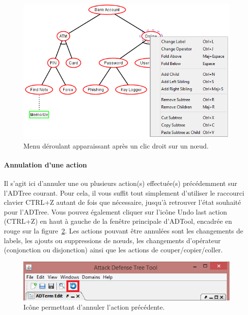     \begin{figure}[H]
        \centering
        \includegraphics[height=0.63\textwidth]{figure/clicdroit.png}
        \caption{Menu déroulant apparaissant après un clic droit sur un n\oe{}ud.}
        \label{fig:clicdroit}
    \end{figure}

\paragraph{Annulation d'une action} Il s'agit ici d'annuler une ou plusieurs action(s) effectuée(s) précédemment sur l'ADTree courant. Pour cela, il vous suffit tout simplement d'utiliser le raccourci clavier {\sc CTRL+Z} autant de fois que nécessaire, jusqu'à retrouver l'état souhaité pour l'ADTree. Vous pouvez également cliquer sur l'icône \og Undo last action (CTRL+Z) \fg{} en haut à gauche de la fenêtre principale d'ADTool, encadrée en rouge sur la {\sc figure}~\ref{fig:undo}. Les actions pouvant être annulées sont les changements de labels, les ajouts ou suppressions de n\oe{}uds, les changements d'opérateur (conjonction ou disjonction) ainsi que les actions de couper/copier/coller.

\begin{figure}[H]
        \centering
        \includegraphics[height=0.17\textwidth]{figure/undo.png}
        \caption{Icône permettant d'annuler l'action précédente.}
        \label{fig:undo}
    \end{figure}